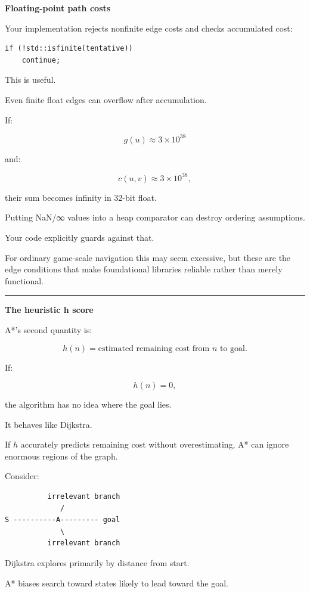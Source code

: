 \textbf{Floating-point path costs}

Your implementation rejects nonfinite edge costs and checks accumulated cost:

\begin{verbatim}
if (!std::isfinite(tentative))
    continue;
\end{verbatim}

This is useful.

Even finite float edges can overflow after accumulation.

If:

\[
g(u)\approx3\times10^{38}
\]

and:

\[
c(u,v)\approx3\times10^{38},
\]

their sum becomes infinity in 32-bit float.

Putting NaN/∞ values into a heap comparator can destroy ordering assumptions.

Your code explicitly guards against that.

For ordinary game-scale navigation this may seem excessive, but these are the edge conditions that make foundational libraries reliable rather than merely functional.

\begin{center}\rule{0.5\linewidth}{0.5pt}\end{center}

\textbf{The heuristic h score}

A*'s second quantity is:

\[
\boxed{
h(n)=
\text{estimated remaining cost from }n\text{ to goal}.
}
\]

If:

\[
h(n)=0,
\]

the algorithm has no idea where the goal lies.

It behaves like Dijkstra.

If \(h\) accurately predicts remaining cost without overestimating, A* can ignore enormous regions of the graph.

Consider:

\begin{verbatim}
          irrelevant branch
             /
S ----------A--------- goal
             \
          irrelevant branch
\end{verbatim}

Dijkstra explores primarily by distance from start.

A* biases search toward states likely to lead toward the goal.

